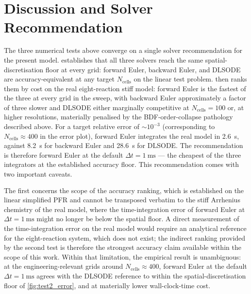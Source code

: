 \section{Discussion and Solver Recommendation}\label{sec:ch4_discussion}

The three numerical tests above converge on a single solver recommendation for the present model.  establishes that all three solvers reach the same spatial-discretisation floor at every grid: forward Euler, backward Euler, and DLSODE are accuracy-equivalent at any target \(N_\mathrm{cells}\) on the linear test problem.  then ranks them by cost on the real eight-reaction stiff model: forward Euler is the fastest of the three at every grid in the sweep, with backward Euler approximately a factor of three slower and DLSODE either marginally competitive at \(N_\mathrm{cells} = 100\) or, at higher resolutions, materially penalised by the BDF-order-collapse pathology described above. For a target relative error of \(\sim 10^{-3}\) (corresponding to \(N_\mathrm{cells} \approx 400\) in the error plot), forward Euler integrates the real model in \SI{2.6}{\second}, against \SI{8.2}{\second} for backward Euler and \SI{28.6}{\second} for DLSODE. The recommendation is therefore forward Euler at the default \(\Delta t = \SI{1}{\milli\second}\) --- the cheapest of the three integrators at the established accuracy floor. This recommendation comes with two important caveats.

\newpage

The first concerns the scope of the accuracy ranking, which is established on the linear simplified PFR and cannot be transposed verbatim to the stiff Arrhenius chemistry of the real model, where the time-integration error of forward Euler at \(\Delta t = \SI{1}{\milli\second}\) might no longer be below the spatial floor. A direct measurement of the time-integration error on the real model would require an analytical reference for the eight-reaction system, which does not exist; the indirect ranking provided by the second test is therefore the strongest accuracy claim available within the scope of this work. Within that limitation, the empirical result is unambiguous: at the engineering-relevant grids around \(N_\mathrm{cells} \approx 400\), forward Euler at the default \(\Delta t = \SI{1}{\milli\second}\) agrees with the DLSODE reference to within the spatial-discretisation floor of \cref{fig:test2_error}, and at materially lower wall-clock-time cost. 

